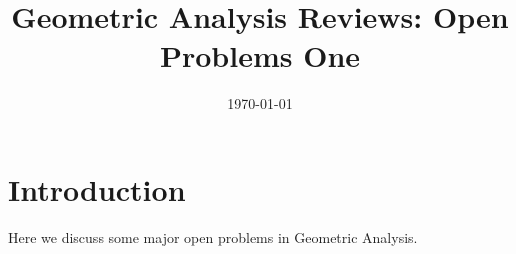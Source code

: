 \documentclass{amsart}
\title[GA Rev Survey]
 {Geometric Analysis Reviews: Open Problems One}
\date{\today}
\begin{document}
\maketitle

\section{Introduction}
\label{sec:intro}

Here we discuss some major open problems in Geometric Analysis.
\end{document}
